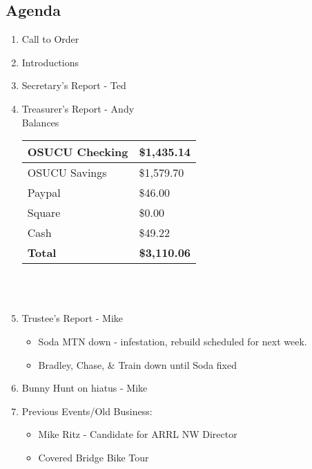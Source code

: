 \documentclass[letter,11pt]{extarticle}
\begin{document}
	\subsection*{Agenda}
	\begin{enumerate}
		\item Call to Order
		\item Introductions
		\item Secretary's Report - Ted
		\item Treasurer's Report - Andy \\
				Balances 
			\begin{tabular}{|l|l|} \hline
				OSUCU Checking & \$1,435.14 \\ \hline
				OSUCU Savings & \$1,579.70 \\ \hline
				Paypal & \$46.00 \\ \hline
				Square & \$0.00 \\ \hline
				Cash & \$49.22 \\ \hline
				\textbf{Total} & \textbf{\$3,110.06} \\ \hline
			\end{tabular} \\ \\
		\item Trustee's Report - Mike
			\begin{itemize}
				\item Soda MTN down - infestation, rebuild scheduled for next week.
				\item Bradley, Chase, \& Train down until Soda fixed
			\end{itemize}
		\item Bunny Hunt on hiatus - Mike
		\item Previous Events/Old Business:
		\begin{itemize}
			\item Mike Ritz - Candidate for ARRL NW Director
			\item Covered Bridge Bike Tour
		\end{itemize}
				

\end{enumerate}
\end{document}
